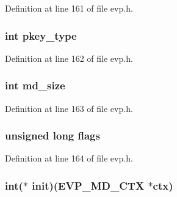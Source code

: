 Definition at line 161 of file evp.\+h.

\subsubsection[{\texorpdfstring{pkey\+\_\+type}{pkey_type}}]{\setlength{\rightskip}{0pt plus 5cm}int pkey\+\_\+type}\hypertarget{structenv__md__st_aceeaae2b1c209aa63672571f3ea4459f}{}\label{structenv__md__st_aceeaae2b1c209aa63672571f3ea4459f}


Definition at line 162 of file evp.\+h.

\subsubsection[{\texorpdfstring{md\+\_\+size}{md_size}}]{\setlength{\rightskip}{0pt plus 5cm}int md\+\_\+size}\hypertarget{structenv__md__st_aca935efe0039c206602d9f27c2a6e148}{}\label{structenv__md__st_aca935efe0039c206602d9f27c2a6e148}


Definition at line 163 of file evp.\+h.

\subsubsection[{\texorpdfstring{flags}{flags}}]{\setlength{\rightskip}{0pt plus 5cm}unsigned long flags}\hypertarget{structenv__md__st_a9e339c2784bd040b26a5112866700bff}{}\label{structenv__md__st_a9e339c2784bd040b26a5112866700bff}


Definition at line 164 of file evp.\+h.

\subsubsection[{\texorpdfstring{init}{init}}]{\setlength{\rightskip}{0pt plus 5cm}int($\ast$ init)({\bf E\+V\+P\+\_\+\+M\+D\+\_\+\+C\+TX} $\ast$ctx)}\hypertarget{structenv__md__st_aee41289d9c13995238b2b06ec0e0b7ab}{}\label{structenv__md__st_aee41289d9c13995238b2b06ec0e0b7ab}



